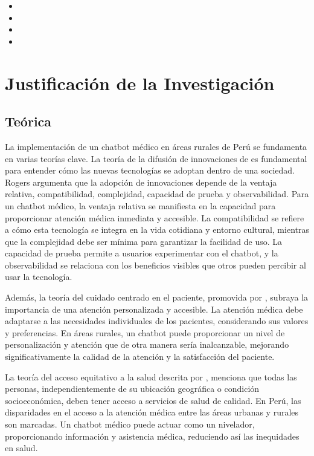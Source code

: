 \begin{itemize}
	\item {\Objone}
	\item {\Objtwo}
	\item {\Objthree}
	\item {\Objfour}
\end{itemize}

\section{Justificación de la Investigación}

\subsection{Teórica}
La implementación de un chatbot médico en áreas rurales de Perú se fundamenta en varias teorías clave. La teoría de la difusión de innovaciones de \cite{rogers2003} es fundamental para entender cómo las nuevas tecnologías se adoptan dentro de una sociedad. Rogers argumenta que la adopción de innovaciones depende de la ventaja relativa, compatibilidad, complejidad, capacidad de prueba y observabilidad. Para un chatbot médico, la ventaja relativa se manifiesta en la capacidad para proporcionar atención médica inmediata y accesible. La compatibilidad se refiere a cómo esta tecnología se integra en la vida cotidiana y entorno cultural, mientras que la complejidad debe ser mínima para garantizar la facilidad de uso. La capacidad de prueba permite a usuarios experimentar con el chatbot, y la observabilidad se relaciona con los beneficios visibles que otros pueden percibir al usar la tecnología.

Además, la teoría del cuidado centrado en el paciente, promovida por \cite{Epstein100}, subraya la importancia de una atención personalizada y accesible. La atención médica debe adaptarse a las necesidades individuales de los pacientes, considerando sus valores y preferencias. En áreas rurales, un chatbot puede proporcionar un nivel de personalización y atención que de otra manera sería inalcanzable, mejorando significativamente la calidad de la atención y la satisfacción del paciente.

La teoría del acceso equitativo a la salud descrita por \cite{Braveman254}, menciona que todas las personas, independientemente de su ubicación geográfica o condición socioeconómica, deben tener acceso a servicios de salud de calidad. En Perú, las disparidades en el acceso a la atención médica entre las áreas urbanas y rurales son marcadas. Un chatbot médico puede actuar como un nivelador, proporcionando información y asistencia médica, reduciendo así las inequidades en salud.

